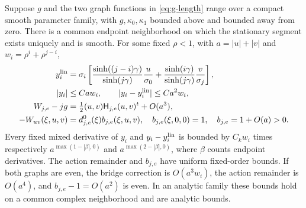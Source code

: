 \begin{lemma}
\label{lem:g-relative}
Suppose $g$ and the two graph functions in \eqref{eq:g-length} range
over a compact smooth parameter family, with $g,\kappa_0,\kappa_1$
bounded above and bounded away from zero. There is a common endpoint
neighborhood on which the stationary segment exists uniquely and is
smooth. For some fixed $\rho<1$, with $a=|u|+|v|$ and
$w_i=\rho^i+\rho^{j-i}$,
\begin{align}\label{eq:g-bridge}
 y_i^{\rm lin}&=\sigma_i\left[
 \frac{\sinh((j-i)\gamma)}{\sinh(j\gamma)}\frac u{\sigma_0}
 +\frac{\sinh(i\gamma)}{\sinh(j\gamma)}\frac v{\sigma_j}\right],\\
 |y_i|&\le Ca w_i,\qquad |y_i-y_i^{\rm lin}|\le Ca^2 w_i,\notag\\
 W_{j,e}-jg&=\tfrac12(u,v)\mathsf H_{j,e}(u,v)^t+O(a^3),\notag\\
 -W_{uv}(\xi,u,v)&=d^0_{j,e}(\xi)b_{j,e}(\xi,u,v),
 \quad b_{j,e}(\xi,0,0)=1,\quad b_{j,e}=1+O(a)>0.
 \label{eq:g-relative}
\end{align}
Every fixed mixed derivative of $y_i$ and $y_i-y_i^{\rm lin}$ is
bounded by $C_k w_i$ times respectively
$a^{\max(1-|\beta|,0)}$ and $a^{\max(2-|\beta|,0)}$, where
$\beta$ counts endpoint derivatives. The action remainder and $b_{j,e}$
have uniform fixed-order bounds. If both graphs are even, the bridge
correction is $O(a^3w_i)$, the action remainder is $O(a^4)$, and
$b_{j,e}-1=O(a^2)$ is even. In an analytic family these bounds hold
on a common complex neighborhood and are analytic bounds.
\end{lemma}

